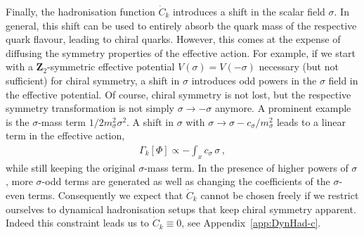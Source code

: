 \documentclass[%
reprint,
superscriptaddress,
showpacs,preprintnumbers,
 amsmath,amssymb,
 aps,
prd,
]{revtex4-1}
\def\app#1{Appendix~\ref{#1}}
\begin{document}
Finally, the hadronisation function $\dot{C}_k$ introduces a shift in
the scalar field $\sigma$. In general, this shift can be used to
entirely absorb the quark mass of the respective quark flavour,
leading to chiral quarks. However, this comes at the expense of
diffusing the symmetry properties of the effective action. For
example, if we start with a $\mathbf{Z}_2$-symmetric effective
potential $V(\sigma) = V(-\sigma)$ necessary (but not sufficient) for
chiral symmetry, a shift in $\sigma$ introduces odd powers in the
$\sigma$ field in the effective potential.  Of course, chiral symmetry
is not lost, but the respective symmetry transformation is not simply
$\sigma\to -\sigma$ anymore. A prominent example is the $\sigma$-mass
term $1/2 m_\sigma^2 \sigma^2$. A shift in $\sigma$ with
$\sigma \to \sigma - c_\sigma/m_\sigma^2 $ leads to a linear term in
the effective action,
%
\begin{align}\label{eq:LinTerm}
  \Gamma_k[\Phi] \propto -\int_x c_\sigma\, \sigma\,, 
\end{align}
%
while still keeping the original $\sigma$-mass term. In the presence
of higher powers of $\sigma$, more $\sigma$-odd terms are generated as
well as changing the coefficients of the $\sigma$-even
terms. Consequently we expect that $\dot{C}_k$ cannot be chosen freely
if we restrict ourselves to dynamical hadronisation setups that keep
chiral symmetry apparent. Indeed this constraint leads us to
$\dot{C}_k\equiv 0$, see \app{app:DynHad-c}.
\end{document}
